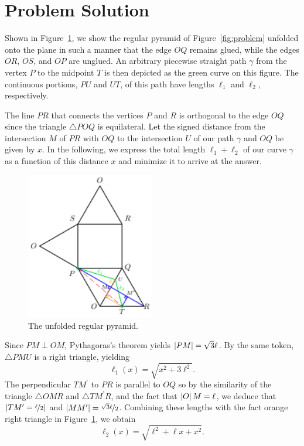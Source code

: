 \section{Problem Solution}
\label{sec:solution}

Shown in Figure~\ref{fig:unfolded}, we show the regular pyramid of
Figure~\ref{fig:problem} unfolded onto the plane in such a manner that the edge
$OQ$ remains glued, while the edges $OR$, $OS$, and $OP$ are unglued. An
arbitrary piecewise straight path $\gamma$ from the vertex $P$ to the midpoint
$T$ is then depicted as the green curve on this figure. The continuous portions,
$PU$ and $UT$, of this path have lengths $\ell_1$ and $\ell_2$, respectively.

The line $PR$ that connects the vertices $P$ and $R$ is orthogonal to the edge
$OQ$ since the triangle $\triangle POQ$ is equilateral. Let the signed distance
from the intersection $M$ of $PR$ with $OQ$ to the intersection $U$ of our path
$\gamma$ and $OQ$ be given by $x$. In the following, we express the total length
$\ell_1 + \ell_2$ of our curve $\gamma$ as a function of this distance $x$ and
minimize it to arrive at the answer.

\begin{figure}[h]
  \centering
  \includegraphics[trim={0 0 0
  0cm},clip,width=0.5\textwidth]{./figures/pyramid-unfolded.pdf}
  \vspace{-8mm}
  \caption{The unfolded regular pyramid.}
  \label{fig:unfolded}
\end{figure}

Since $PM \perp OM$, Pythagoras's theorem yields $\left|{PM}\right| = \sqrt{3}\ell$. By
the same token, $\triangle PMU$ is a right triangle, yielding 
%
\begin{equation}
    \ell_1(x) = \sqrt{x^2 + 3\ell^2}. 
    \label{eq:ell1}
\end{equation}    
%
The perpendicular $TM^\prime$ to $PR$ is parallel to $OQ$ so by the similarity
of the triangle $\triangle OMR$ and $\triangle TM^\prime R$, and the fact that
$\left|{O}\right|M = \ell$, we deduce that $\left|{TM^\prime = \nicefrac{\ell}{2}}\right|$ and
$\left|{MM^\prime}\right| = \nicefrac{\sqrt{3}\ell}{2}$. Combining these lengths with the
fact orange right triangle in Figure~\ref{fig:unfolded}, we obtain 
%
\begin{equation}
  \ell_2(x) = \sqrt{\ell^2 + \ell x + x^2}.
  \label{eq:ell2}
\end{equation}

